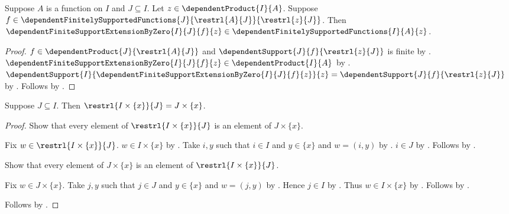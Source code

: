 \begin{theorem}\label{dependent_finite_support_extension_by_zero_preserves_support}
    Suppose $A$ is a function on $I$ and $J\subseteq I$.
    Let $z\in\dependentProduct{I}{A}$.
    Suppose
        $f\in\dependentFinitelySupportedFunctions
            {J}{\restrl{A}{J}}{\restrl{z}{J}}$.
    Then
        $\dependentFiniteSupportExtensionByZero{I}{J}{f}{z}
            \in\dependentFinitelySupportedFunctions{I}{A}{z}$.
\end{theorem}
\begin{proof}
    $f\in\dependentProduct{J}{\restrl{A}{J}}$ and
        $\dependentSupport{J}{f}{\restrl{z}{J}}$ is finite by
        .
    $\dependentFiniteSupportExtensionByZero{I}{J}{f}{z}
        \in\dependentProduct{I}{A}$ by
        .
    $\dependentSupport{I}{
            \dependentFiniteSupportExtensionByZero{I}{J}{f}{z}}{z}
        =\dependentSupport{J}{f}{\restrl{z}{J}}$ by
        .
    Follows by .
\end{proof}

\begin{lemma}\label{constant_graph_restriction}
    Suppose $J\subseteq I$.
    Then $\restrl{I\times\{x\}}{J}=J\times\{x\}$.
\end{lemma}
\begin{proof}
    Show that every element of $\restrl{I\times\{x\}}{J}$ is an
        element of $J\times\{x\}$.
    \begin{subproof}
        Fix $w\in\restrl{I\times\{x\}}{J}$.
        $w\in I\times\{x\}$ by
            .
        Take $i,y$ such that $i\in I$ and $y\in\{x\}$ and $w=(i,y)$ by
            .
        $i\in J$ by .
        Follows by .
    \end{subproof}
    Show that every element of $J\times\{x\}$ is an element of
        $\restrl{I\times\{x\}}{J}$.
    \begin{subproof}
        Fix $w\in J\times\{x\}$.
        Take $j,y$ such that $j\in J$ and $y\in\{x\}$ and $w=(j,y)$ by
            .
        Hence $j\in I$ by .
        Thus $w\in I\times\{x\}$ by .
        Follows by .
    \end{subproof}
    Follows by .
\end{proof}

